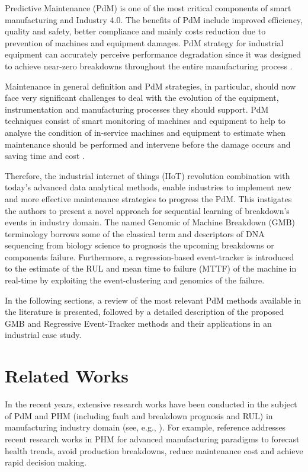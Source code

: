 \documentclass[conference]{IEEEtran}
\begin{document}
Predictive Maintenance (PdM) is one of the most critical components of smart manufacturing and Industry 4.0\cite{Calabrese2019}. The beneﬁts of PdM include improved efficiency, quality and safety, better compliance and mainly costs reduction due to prevention of machines and equipment damages. PdM strategy for industrial equipment can accurately perceive performance degradation since it was designed to achieve near-zero breakdowns throughout the entire manufacturing process \cite{Zhang2019}.  

Maintenance in general definition and PdM strategies, in particular, should now face very significant challenges to deal with the evolution of the equipment, instrumentation and manufacturing processes they should support. PdM techniques consist of smart monitoring of machines and equipment to help to analyse the condition of in-service machines and equipment to estimate when maintenance should be performed and intervene before the damage occurs and saving time and cost \cite{Calabrese2019}.

Therefore, the industrial internet of things (IIoT) revolution combination with today's advanced data analytical methods, enable industries to implement new and more eﬀective maintenance strategies to progress the PdM. This instigates the authors to present a novel approach for sequential learning of breakdown's events in industry domain. The named Genomic of Machine Breakdown (GMB) terminology borrows some of the classical term and descriptors of DNA sequencing from biology science to prognosis the upcoming breakdowns or components failure. Furthermore, a regression-based event-tracker is introduced to the estimate of the RUL and mean time to failure (MTTF) of the machine in real-time by exploiting the event-clustering and genomics of the failure. 

In the following sections, a review of the most relevant PdM methods available in the literature is presented, followed by a detailed description of the proposed GMB and Regressive Event-Tracker methods and their applications in an industrial case study.


\section{Related Works}
\label{sec:Related_works}
In the recent years, extensive research works have been conducted in the subject of PdM and PHM (including fault and breakdown prognosis and RUL) in manufacturing industry domain (see, e.g., \cite{Guo2017,Kordestani2019,Razavi-Far2019a,Razavi-Far2019b,Nguyen2019}). For example, reference \cite{Xia2018} addresses recent research works in PHM for advanced manufacturing paradigms to forecast health trends, avoid production breakdowns, reduce maintenance cost and achieve rapid decision making.
\end{document}
